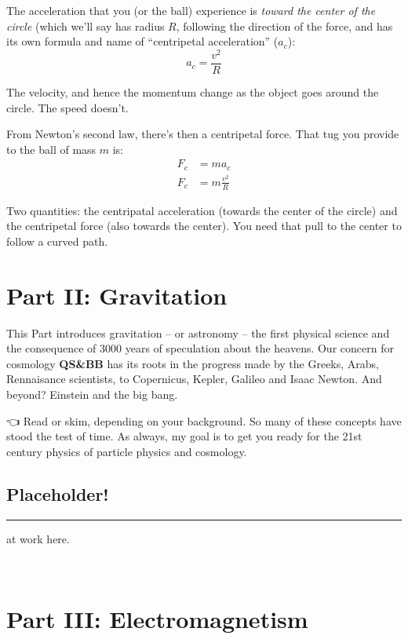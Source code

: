 \documentclass[
  letterpaper,
  DIV=11,
  numbers=noendperiod,
  oneside]{scrreprt}
\begin{document}
The acceleration that you (or the ball) experience is \emph{toward the
center of the circle} (which we'll say has radius \(R\), following the
direction of the force, and has its own formula and name of
``centripetal acceleration'' (\(a_c\)): \[
a_c=\frac{v^2}{R} \label{centripetala}
\]

The velocity, and hence the momentum change as the object goes around
the circle. The speed doesn't.

From Newton's second law, there's then a centripetal force. That tug you
provide to the ball of mass \(m\) is: \[
\begin{align}
F_c &= m a_c \nonumber \\
F_c &=m \frac{v^2}{R} \label{centripetalf}
\end{align}
\]

Two quantities: the centripatal acceleration (towards the center of the
circle) and the centripetal force (also towards the center). You need
that pull to the center to follow a curved path.

\part{Part II: Gravitation}

This Part introduces gravitation -- or astronomy -- the first physical
science and the consequence of 3000 years of speculation about the
heavens. Our concern for cosmology \textbf{QS\&BB} has its roots in the
progress made by the Greeks, Arabs, Rennaisance scientists, to
Copernicus, Kepler, Galileo and Isaac Newton. And beyond? Einstein and
the big bang.

👈 Read or skim, depending on your background. So many of these concepts
have stood the test of time. As always, my goal is to get you ready for
the 21st century physics of particle physics and cosmology.

\chapter{Placeholder!}\label{placeholder}

\begin{center}\rule{0.5\linewidth}{0.5pt}\end{center}

at work here.

😵‍💫

\part{Part III: Electromagnetism}
\end{document}
